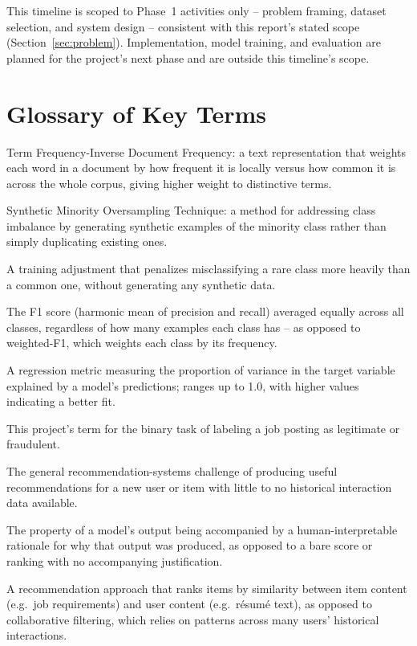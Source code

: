 \documentclass[11pt,a4paper]{article}
\begin{document}
This timeline is scoped to Phase~1 activities only -- problem framing, dataset
selection, and system design -- consistent with this report's stated scope
(Section~\ref{sec:problem}). Implementation, model training, and evaluation are planned
for the project's next phase and are outside this timeline's scope.

\section*{Glossary of Key Terms}

\begin{description}[leftmargin=3.2cm, style=nextline]
\item[TF-IDF] Term Frequency-Inverse Document Frequency: a text representation that
weights each word in a document by how frequent it is locally versus how common it is
across the whole corpus, giving higher weight to distinctive terms.
\item[SMOTE] Synthetic Minority Oversampling Technique: a method for addressing class
imbalance by generating synthetic examples of the minority class rather than simply
duplicating existing ones.
\item[Class-weighted loss] A training adjustment that penalizes misclassifying a rare
class more heavily than a common one, without generating any synthetic data.
\item[Macro-F1] The F1 score (harmonic mean of precision and recall) averaged equally
across all classes, regardless of how many examples each class has -- as opposed to
weighted-F1, which weights each class by its frequency.
\item[R\textsuperscript{2} (coefficient of determination)] A regression metric
measuring the proportion of variance in the target variable explained by a model's
predictions; ranges up to 1.0, with higher values indicating a better fit.
\item[Genuineness classification] This project's term for the binary task of labeling a
job posting as legitimate or fraudulent.
\item[Cold-start problem] The general recommendation-systems challenge of producing
useful recommendations for a new user or item with little to no historical interaction
data available.
\item[Explainability] The property of a model's output being accompanied by a
human-interpretable rationale for why that output was produced, as opposed to a bare
score or ranking with no accompanying justification.
\item[Content-based recommendation] A recommendation approach that ranks items by
similarity between item content (e.g.\ job requirements) and user content (e.g.\
r\'esum\'e text), as opposed to collaborative filtering, which relies on patterns across
many users' historical interactions.
\end{description}
\end{document}
